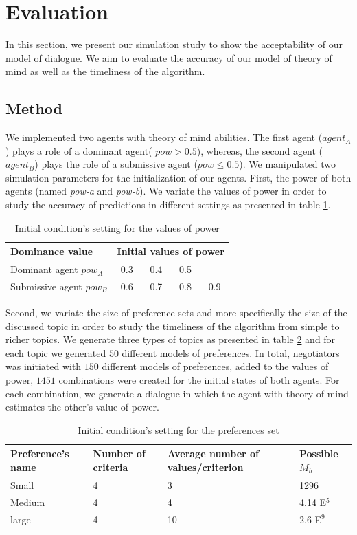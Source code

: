 \documentclass[conference, letterpaper]{IEEEtran}
\begin{document}
\section{Evaluation}
In this section, we present our simulation study to show the acceptability of our model of dialogue. We aim to evaluate the accuracy of our model of theory of mind as well as the timeliness of the algorithm.

\subsection{Method}

We implemented two agents with theory of mind abilities.
The first agent ($agent_A$) plays a role of a dominant agent( $pow > 0.5$), whereas, the second agent ($agent_B$) plays the role of a submissive agent ($pow \leq 0.5$). 
We manipulated two simulation parameters for the initialization of our agents. First, the power of both agents (named \emph{pow-a} and \emph{pow-b}). We variate the values of power in order to study the accuracy of predictions in different settings as presented in table \ref{tab:powsettings}.
\begin{table}[t]
	\centering
	\begin{tabular}{|l|cccc|}
		\hline 
		\textbf{Dominance value } &	\multicolumn{4}{c|}{ Initial values of power } \\
		\hline
		Dominant agent $pow_A$ & 0.3 & 0.4 & 0.5 &  \\
		\hline
		Submissive agent $pow_B$ & 0.6 & 0.7 & 0.8 & 0.9\\
		\hline
	\end{tabular}
	\caption{Initial condition's setting for the values of power} 
	\label{tab:powsettings}
\end{table}

Second, we variate the size of preference sets and more specifically the size of the discussed topic in order to study the timeliness of the algorithm from simple to richer topics. We generate three types of topics as presented in table \ref{tab:initP} and for each topic we generated $50$ different models of preferences. In total, negotiators was initiated with $150$ different models of preferences, added to the values of power,  $1451$ combinations were created for the initial states of both agents. For each combination, we generate a dialogue in which the agent with theory of mind estimates the other's value of power.


\begin{table}[]
	\centering
	\begin{tabular}{|p{1.75cm}|p{1.5cm}|p{1.75cm}|p{1.5cm}|}
		\hline 
		\textbf{Preference's name } & Number of criteria & Average number of values/criterion & Possible $M_h$\\
		\hline
		Small & 4 & 3 & 1296 \\
		\hline
		Medium & 4 & 4 & 4.14 E$^5$ \\
		\hline
		large & 4 & 10 & 2.6 E$^9$ \\
		\hline
	\end{tabular}
	\caption{Initial condition's setting for the preferences set} 
	\label{tab:initP}
\end{table}
\end{document}
